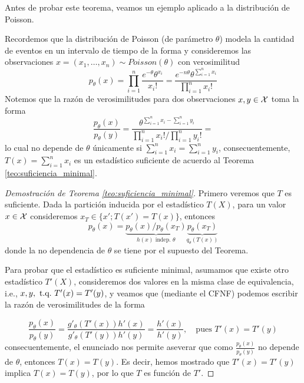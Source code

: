 Antes de probar este teorema, veamos un ejemplo aplicado a la distribución de Poisson. 
\begin{example}
	Recordemos que la distribución de Poisson (de parámetro $\theta$) modela la cantidad de eventos en un intervalo de tiempo de la forma y consideremos las observaciones $x=(x_1,\ldots, x_n)\sim Poisson(\theta)$ con verosimilitud
	\begin{equation}
		p_\theta(x) = \prod_{i=1}^n\frac{e^{-\theta}\theta^{x_i}}{x_i!} = \frac{e^{-n\theta}\theta^{\sum_{i=1}^n x_i}}{\prod_{i=1}^nx_i!}
	\end{equation}
	Notemos que la razón de verosimilitudes para dos observaciones $x,y\in{\mathcal X}$ toma la forma 
		\begin{equation}
		\frac{p_\theta(x)}{p_\theta(y)} = \frac{\theta^{\sum_{i=1}^n x_i - \sum_{i=1}^n y_i}} {\prod_{i=1}^nx_i! / \prod_{i=1}^ny_i!}= 
	\end{equation}
	lo cual no depende de $\theta$ únicamente si $\sum_{i=1}^n x_i  = \sum_{i=1}^n y_i$, consecuentemente, $T(x) = \sum_{i=1}^n x_i$ es un estadístico suficiente de acuerdo al Teorema \ref{teo:suficiencia_minimal}.
\end{example}

\begin{proof}[Demostración de Teorema \ref{teo:suficiencia_minimal}] Primero veremos que $T$ es suficiente. Dada la partición inducida por el estadístico $T(X)$, para un valor $x\in{\mathcal X}$ consideremos $x_T\in\{x'; T(x') = T(x)\}$, entonces
\begin{equation}
 	p_\theta(x) = \underbrace{{p_\theta(x) }/{p_\theta(x_T) }}_{h(x)\text{ indep.  } \theta} \underbrace{p_\theta(x_T) }_{q_\theta(T(x))	}
 \end{equation} 
 donde la no dependencia de $\theta$ se tiene por el supuesto del Teorema. 

 Para probar que el estadístico es suficiente minimal, asumamos que existe otro estadístico $T'(X)$, consideremos dos valores en la misma clase de equivalencia, i.e., $x,y,\ {\text{t.q.}}\ T'(x) = T'(y)$, y veamos que  (mediante el CFNF) podemos escribir la razón de verosimilitudes de la forma

 \begin{equation}
 	\frac{p_\theta(x)}{p_\theta(y)} = \frac{g'_\theta(T'(x))h'(x)}{g'_\theta(T'(y))h'(y)} = \frac{h'(x)}{h'(y)}, \quad \text{pues } T'(x) = T'(y) 
 \end{equation}
 consecuentemente, el enunciado nos permite aseverar que como $\frac{p_\theta(x)}{p_\theta(y)}$ no depende de $\theta$, entonces $T(x) = T(y)$. Es decir, hemos mostrado que $T'(x) = T'(y)$ implica $T(x) = T(y)$, por lo que $T$ es función de $T'$.
	
\end{proof}

